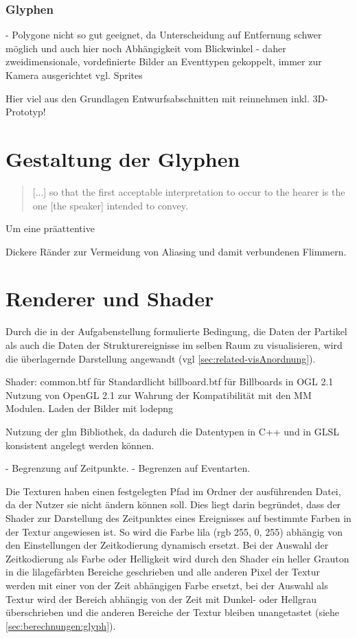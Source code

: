 \subsubsection{Glyphen}
- Polygone nicht so gut geeignet, da Unterscheidung auf Entfernung schwer möglich und auch hier noch Abhängigkeit vom Blickwinkel
- daher zweidimensionale, vordefinierte Bilder an Eventtypen gekoppelt, immer zur Kamera ausgerichtet vgl. Sprites

Hier viel aus den Grundlagen Entwurfsabschnitten mit reinnehmen inkl. 3D-Prototyp!

\section{Gestaltung der Glyphen}\label{sec:visualisierung:glyphen}
\blockcquote[64]{infantidou2001evidentials}{[...] so that the first acceptable interpretation to occur to the hearer is the one [the speaker] intended to convey.}

Um eine präattentive 

Dickere Ränder zur Vermeidung von Aliasing und damit verbundenen Flimmern.

\section{Renderer und Shader}\label{sec:renderer}

Durch die in der Aufgabenstellung formulierte Bedingung, die Daten der Partikel als auch die Daten der Strukturereignisse im selben Raum zu visualisieren, wird die überlagernde Darstellung angewandt (vgl \autoref{sec:related-visAnordnung}).


Shader:
common.btf für Standardlicht
billboard.btf für Billboards in OGL 2.1
Nutzung von OpenGL 2.1 zur Wahrung der Kompatibilität mit den MM Modulen.
Laden der Bilder mit lodepng

Nutzung der glm Bibliothek, da dadurch die Datentypen in C++ und in GLSL konsistent angelegt werden können.

- Begrenzung auf Zeitpunkte.
- Begrenzen auf Eventarten.

Die Texturen haben einen festgelegten Pfad im Ordner der ausführenden Datei, da der Nutzer sie nicht ändern können soll. Dies liegt darin begründet, dass der Shader zur Darstellung des Zeitpunktes eines Ereignisses auf bestimmte Farben in der Textur angewiesen ist. So wird die Farbe lila (rgb 255, 0, 255) abhängig von den Einstellungen der Zeitkodierung dynamisch ersetzt. Bei der Auswahl der Zeitkodierung als Farbe oder Helligkeit wird durch den Shader ein heller Grauton in die lilagefärbten Bereiche geschrieben und alle anderen Pixel der Textur werden mit einer von der Zeit abhängigen Farbe ersetzt, bei der Auswahl als Textur wird der Bereich abhängig von der Zeit mit Dunkel- oder Hellgrau überschrieben und die anderen Bereiche der Textur bleiben unangetastet (siehe \autoref{sec:berechnungen:glyph}).

